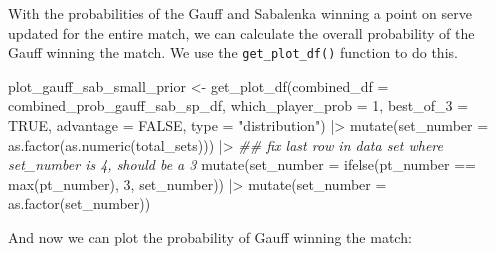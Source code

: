 \documentclass[
  letterpaper,
  DIV=11,
  numbers=noendperiod]{scrartcl}
\newenvironment{Shaded}{\begin{snugshade}}{\end{snugshade}}
\newcommand{\AttributeTok}[1]{\textcolor[rgb]{0.40,0.45,0.13}{#1}}
\newcommand{\ConstantTok}[1]{\textcolor[rgb]{0.56,0.35,0.01}{#1}}
\newcommand{\DecValTok}[1]{\textcolor[rgb]{0.68,0.00,0.00}{#1}}
\newcommand{\DocumentationTok}[1]{\textcolor[rgb]{0.37,0.37,0.37}{\textit{#1}}}
\newcommand{\FunctionTok}[1]{\textcolor[rgb]{0.28,0.35,0.67}{#1}}
\newcommand{\NormalTok}[1]{\textcolor[rgb]{0.00,0.23,0.31}{#1}}
\newcommand{\OtherTok}[1]{\textcolor[rgb]{0.00,0.23,0.31}{#1}}
\newcommand{\SpecialCharTok}[1]{\textcolor[rgb]{0.37,0.37,0.37}{#1}}
\newcommand{\StringTok}[1]{\textcolor[rgb]{0.13,0.47,0.30}{#1}}
\begin{document}
With the probabilities of the Gauff and Sabalenka winning a point on
serve updated for the entire match, we can calculate the overall
probability of the Gauff winning the match. We use the
\texttt{get\_plot\_df()} function to do this.

\linespread{0.9}

\begin{Shaded}
\begin{Highlighting}[]
\NormalTok{plot\_gauff\_sab\_small\_prior }\OtherTok{\textless{}{-}} \FunctionTok{get\_plot\_df}\NormalTok{(}\AttributeTok{combined\_df =}\NormalTok{ combined\_prob\_gauff\_sab\_sp\_df,}
                                        \AttributeTok{which\_player\_prob =} \DecValTok{1}\NormalTok{,}
                                        \AttributeTok{best\_of\_3 =} \ConstantTok{TRUE}\NormalTok{,}
                                        \AttributeTok{advantage =} \ConstantTok{FALSE}\NormalTok{,}
                                        \AttributeTok{type =} \StringTok{"distribution"}\NormalTok{) }\SpecialCharTok{|\textgreater{}}
  \FunctionTok{mutate}\NormalTok{(}\AttributeTok{set\_number =} \FunctionTok{as.factor}\NormalTok{(}\FunctionTok{as.numeric}\NormalTok{(total\_sets))) }\SpecialCharTok{|\textgreater{}}
  \DocumentationTok{\#\# fix last row in data set where set\_number is 4, should be a 3}
  \FunctionTok{mutate}\NormalTok{(}\AttributeTok{set\_number =} \FunctionTok{ifelse}\NormalTok{(pt\_number }\SpecialCharTok{==} \FunctionTok{max}\NormalTok{(pt\_number), }\StringTok{\textquotesingle{}3\textquotesingle{}}\NormalTok{, set\_number)) }\SpecialCharTok{|\textgreater{}}
  \FunctionTok{mutate}\NormalTok{(}\AttributeTok{set\_number =} \FunctionTok{as.factor}\NormalTok{(set\_number))}
\end{Highlighting}
\end{Shaded}

\linespread{2}

And now we can plot the probability of Gauff winning the match:

\linespread{0.9}
\end{document}
